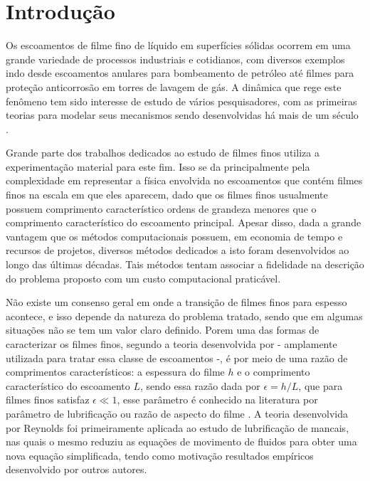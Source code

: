 \chapter{Introdução}
Os escoamentos de filme fino de líquido em superfícies sólidas ocorrem em uma grande variedade de processos industriais e cotidianos, com diversos exemplos indo desde escoamentos anulares para bombeamento de petróleo até filmes para proteção anticorrosão em torres de lavagem de gás. A dinâmica que rege este fenômeno tem sido interesse de estudo de vários pesquisadores, com as  primeiras teorias para modelar seus mecanismos sendo desenvolvidas há mais de um século \citep{Oron1997,Craster2009}. 

Grande parte dos trabalhos dedicados ao estudo de filmes finos utiliza a experimentação material para este fim. Isso se da principalmente pela complexidade em representar a física envolvida no escoamentos que contém filmes finos na escala em que eles aparecem, dado que os filmes finos usualmente possuem comprimento característico ordens de grandeza menores que o comprimento característico do escoamento principal. Apesar disso, dada a grande vantagem que os métodos computacionais possuem, em economia de tempo e recursos de projetos, diversos métodos dedicados a isto foram desenvolvidos ao longo das últimas décadas. Tais métodos tentam associar a fidelidade na descrição do problema proposto com um custo computacional praticável. 


Não existe um consenso geral em onde a transição de filmes finos para espesso acontece, e isso depende da natureza do problema tratado, sendo que em algumas situações  não se tem um valor claro definido. Porem uma das formas de caracterizar os filmes finos, segundo a teoria desenvolvida por \citet{Reynolds1886} - amplamente utilizada para tratar essa classe de escoamentos -, é por meio de uma razão de comprimentos característicos: a espessura do filme $h$ e o comprimento característico do escoamento $L$, sendo essa razão dada por $\epsilon = h/L$, que para filmes finos satisfaz $\epsilon \ll 1$, esse parâmetro é conhecido na literatura por parâmetro de lubrificação ou razão de aspecto do filme \citep{Craster2009}. A teoria desenvolvida por Reynolds foi primeiramente aplicada ao estudo de lubrificação de mancais, nas quais o mesmo reduziu as equações de movimento de fluidos para obter uma nova equação simplificada, tendo como motivação resultados empíricos desenvolvido por outros autores.

